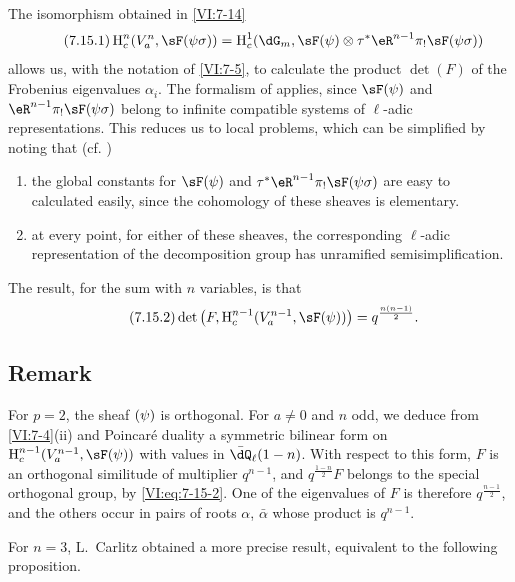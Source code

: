 The isomorphism obtained in \ref{VI:7-14} 
\begin{equation*}\tag{7.15.1}\label{VI:eq:7-15-1}
  \h_c^n(V_a^n,\sF(\psi\sigma)) = \h_c^1(\dG_m,\sF(\psi)\otimes \tau^\ast \eR^{n-1} \pi_! \sF(\psi\sigma)) 
\end{equation*}
allows us, with the notation of \ref{VI:7-5}, to calculate the product $\det(F)$ 
of the Frobenius eigenvalues $\alpha_i$. The formalism of \cite{de73} 
applies, since $\sF(\psi)$ and $\eR^{n-1} \pi_! \sF(\psi\sigma)$ 
belong to infinite compatible systems of $\ell$-adic 
representations. This reduces us to local problems, which can be 
simplified by noting that (cf. \cite[9.5]{de73}) 
\begin{enumerate}[\indent a)]
  \item the global constants for 
    $\sF(\psi)$ and $\tau^\ast \eR^{n-1} \pi_! \sF(\psi\sigma)$ are easy to 
    calculated easily, since the cohomology of these sheaves is elementary. 
  \item at every point, for either of these sheaves, the 
    corresponding $\ell$-adic representation of the decomposition group 
    has unramified semisimplification. 
\end{enumerate}

The result, for the sum with $n$ variables, is that 
\begin{equation*}\tag{7.15.2}\label{VI:eq:7-15-2}
  \det\left(F,\h_c^{n-1}(V_a^{n-1},\sF(\psi))\right) = q^{\frac{n(n-1)}{2}} \text{.} 
\end{equation*}





\subsection{Remark}\label{VI:7-16}

For $p=2$, the sheaf $\sf(\psi)$ is orthogonal. For $a\ne 0$ and $n$ 
odd, we deduce from \ref{VI:7-4}(ii) and Poincaré duality a 
symmetric bilinear form on $\h_c^{n-1}(V_a^{n-1},\sF(\psi))$ with 
values in $\bar\dQ_\ell(1-n)$. With respect to this form, $F$ is an 
orthogonal similitude of multiplier $q^{n-1}$, and $q^{\frac{1-n}{2}} F$ 
belongs to the special orthogonal group, by \eqref{VI:eq:7-15-2}. One 
of the eigenvalues of $F$ is therefore $q^{\frac{n-1}{2}}$, and the others 
occur in pairs of roots $\alpha$, $\bar\alpha$ whose product is $q^{n-1}$. 

For $n=3$, L.\ Carlitz \cite{ca69-2} obtained a more precise result, 
equivalent to the following proposition. 





